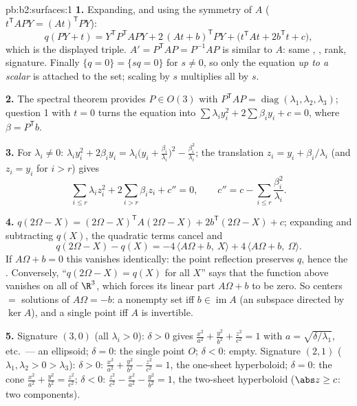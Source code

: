 \begin{solution}{pb:b2:surfaces:1}
\textbf{1.} Expanding, and using the symmetry of $A$
($t^{\mathsf T}\!APY = (At)^{\mathsf T}PY$):
\[
q(PY + t) = Y^{\mathsf T}P^{\mathsf T}\!APY +
2\,(At + b)^{\mathsf T}PY + \bigl(t^{\mathsf T}\!At +
2b^{\mathsf T}t + c\bigr),
\]
which is the displayed triple. $A' = P^{\mathsf T}\!AP =
P^{-1}AP$ is similar to $A$: same ,
, rank, signature. Finally $\{q = 0\} = \{sq = 0\}$
for $s \neq 0$, so only the equation \emph{up to a scalar} is
attached to the set; scaling by $s$ multiplies all 
by $s$.

\textbf{2.} The spectral theorem provides $P \in O(3)$ with
$P^{\mathsf T}\!AP = \operatorname{diag}(\lambda_1, \lambda_2,
\lambda_3)$; question 1 with $t = 0$ turns the equation into
$\sum\lambda_iy_i^2 + 2\sum\beta_iy_i + c = 0$, where $\beta =
P^{\mathsf T}b$.

\textbf{3.} For $\lambda_i \neq 0$: $\lambda_iy_i^2 +
2\beta_iy_i = \lambda_i\bigl(y_i +
\frac{\beta_i}{\lambda_i}\bigr)^2 -
\frac{\beta_i^2}{\lambda_i}$; the translation $z_i = y_i +
\beta_i/\lambda_i$ (and $z_i = y_i$ for $i > r$) gives
\[
\sum_{i \leq r}\lambda_iz_i^2 + 2\sum_{i > r}\beta_iz_i +
c'' = 0, \qquad
c'' = c - \sum_{i\leq r}\frac{\beta_i^2}{\lambda_i}.
\]

\textbf{4.} $q(2\Omega - X) = (2\Omega - X)^{\mathsf T}
A(2\Omega - X) + 2b^{\mathsf T}(2\Omega - X) + c$; expanding
and subtracting $q(X)$, the quadratic terms cancel and
\[
q(2\Omega - X) - q(X) = -4\,\langle A\Omega + b,\ X\rangle +
4\,\langle A\Omega + b,\ \Omega\rangle .
\]
If $A\Omega + b = 0$ this vanishes identically: the point
reflection preserves $q$, hence the . Conversely,
``$q(2\Omega - X) = q(X)$ for all $X$'' says that the 
function above vanishes on all of $\R^3$, which forces its
linear part $A\Omega + b$ to be zero. So centers $=$ solutions of
$A\Omega = -b$: a nonempty set iff $b \in \operatorname{im}A$
(an  subspace directed by $\ker A$), and a single point
iff $A$ is invertible.

\textbf{5.} Signature $(3,0)$ (all $\lambda_i > 0$): $\delta >
0$ gives $\frac{x^2}{a^2} + \frac{y^2}{b^2} + \frac{z^2}{c^2}
= 1$ with $a = \sqrt{\delta/\lambda_1}$, etc.\ --- an
ellipsoid; $\delta = 0$: the single point $O$; $\delta < 0$:
empty. Signature $(2,1)$ ($\lambda_1, \lambda_2 > 0 >
\lambda_3$): $\delta > 0$: $\frac{x^2}{a^2} + \frac{y^2}{b^2}
- \frac{z^2}{c^2} = 1$, the one-sheet hyperboloid; $\delta =
0$: the cone $\frac{x^2}{a^2} + \frac{y^2}{b^2} =
\frac{z^2}{c^2}$; $\delta < 0$: $\frac{z^2}{c^2} -
\frac{x^2}{a^2} - \frac{y^2}{b^2} = 1$, the two-sheet
hyperboloid ($\abs z \geq c$: two components).


\end{solution}
